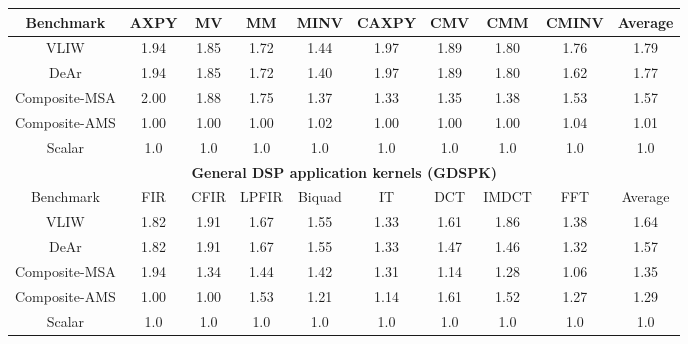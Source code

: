 {\begin{table}[!ht]
{\begin{tabular}{|c|c|c|c|c|c|c|c|c|c|}
                Benchmark  &  AXPY  &  MV  &  MM  &  MINV  &  CAXPY  &  CMV  &  CMM  &  CMINV  &  Average \\ \hline 
                VLIW  &   1.94  &   1.85  &   1.72  &   1.44  &   1.97  &   1.89  &   1.80  &   1.76  &   1.79     \\ \hline 
                DeAr  &   1.94  &   1.85  &   1.72  &   1.40  &   1.97  &   1.89  &   1.80  &   1.62  &   1.77     \\ \hline
                Composite-MSA  &   2.00  &   1.88  &   1.75  &   1.37  &   1.33  &   1.35  &   1.38  &   1.53  &   1.57     \\ \hline 
                Composite-AMS  &   1.00  &   1.00  &   1.00  &   1.02  &   1.00  &   1.00  &   1.00  &   1.04  &   1.01     \\ \hline 
                Scalar  & 1.0  & 1.0  & 1.0  & 1.0  & 1.0  & 1.0  & 1.0  & 1.0  & 1.0 \\ \hline 
                \multicolumn{10}{|c|}{\textbf{General DSP application kernels (GDSPK)}}                     \\ \hline
                Benchmark  &  FIR  &  CFIR  &  LPFIR  &  Biquad  &  IT  &  DCT  &  IMDCT  &  FFT  &  Average \\ \hline 
                VLIW  &   1.82  &   1.91  &   1.67  &   1.55  &   1.33  &   1.61  &   1.86  &   1.38  &   1.64     \\ \hline 
                DeAr  &   1.82  &   1.91  &   1.67  &   1.55  &   1.33  &   1.47  &   1.46  &   1.32  &   1.57     \\ \hline 
                Composite-MSA  &   1.94  &   1.34  &   1.44  &   1.42  &   1.31  &   1.14  &   1.28  &   1.06  &   1.35     \\ \hline 
                Composite-AMS  &   1.00  &   1.00  &   1.53  &   1.21  &   1.14  &   1.61  &   1.52  &   1.27  &   1.29     \\ \hline 
                Scalar  & 1.0  & 1.0  & 1.0  & 1.0  & 1.0  & 1.0  & 1.0  & 1.0  & 1.0 \\ \hline 
            \end{tabular}
        }
    \end{table}
}
